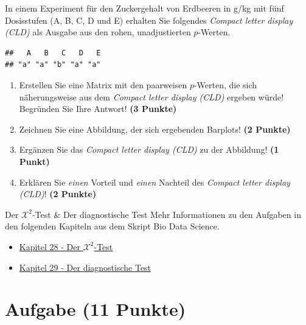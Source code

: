\documentclass[a4paper, 9pt]{scrartcl}\usepackage[]{graphicx}\usepackage[]{xcolor}
\makeatletter
\newenvironment{kframe}{%
 \def\at@end@of@kframe{}%
 \ifinner\ifhmode%
  \def\at@end@of@kframe{\end{minipage}}%
  \begin{minipage}{\columnwidth}%
 \fi\fi%
 \def\FrameCommand##1{\hskip\@totalleftmargin \hskip-\fboxsep
 \colorbox{shadecolor}{##1}\hskip-\fboxsep
     \hskip-\linewidth \hskip-\@totalleftmargin \hskip\columnwidth}%
 \MakeFramed {\advance\hsize-\width
   \@totalleftmargin\z@ \linewidth\hsize
   \@setminipage}}%
 {\par\unskip\endMakeFramed%
 \at@end@of@kframe}
\newenvironment{knitrout}{}{} %
\makeatother
\begin{document}
 
 In einem Experiment f{\"u}r den Zuckergehalt von Erdbeeren in g/kg mit f{\"u}nf
 Dosisstufen (A, B, C, D und E) erhalten Sie folgendes \textit{Compact
   letter display (CLD)} als \Rlogo Ausgabe aus den rohen, unadjustierten
 $p$-Werten.



\begin{knitrout}
\color{fgcolor}\begin{kframe}
\begin{verbatim}
##   A   B   C   D   E 
## "a" "a" "b" "a" "a"
\end{verbatim}
\end{kframe}
\end{knitrout}

\begin{enumerate}
\item Erstellen Sie eine Matrix mit den paarweisen $p$-Werten, die sich
  n{\"a}herungsweise aus dem \textit{Compact letter display (CLD)} ergeben w{\"u}rde! Begr{\"u}nden Sie Ihre Antwort! \textbf{(3 Punkte)}
\item Zeichnen Sie eine Abbildung, der sich ergebenden Barplots! \textbf{(2 Punkte)}
\item Erg{\"a}nzen Sie das \textit{Compact letter display (CLD)} zu der
  Abbildung! \textbf{(1 Punkt)}
\item Erkl{\"a}ren Sie \textit{einen} Vorteil und \textit{einen} Nachteil des \textit{Compact letter display (CLD)}! \textbf{(2 Punkte)}
\end{enumerate}

 
\clearpage
  \begin{graybox}{Der $\mathcal{X}^2$-Test \& Der diagnostische Test}
Mehr Informationen zu den Aufgaben in den folgenden Kapiteln aus dem Skript Bio Data Science.
  \begin{itemize}
  \item \href{https://jkruppa.github.io/stat-tests-chi-test.html}{Kapitel 28 - Der $\mathcal{X}^2$-Test}
  \item \href{https://jkruppa.github.io/stat-tests-diagnostic.html}{Kapitel 29 - Der diagnostische Test}
  \end{itemize}
\end{graybox}
\clearpage

\section{Aufgabe \hfill (11 Punkte)}
\end{document}
